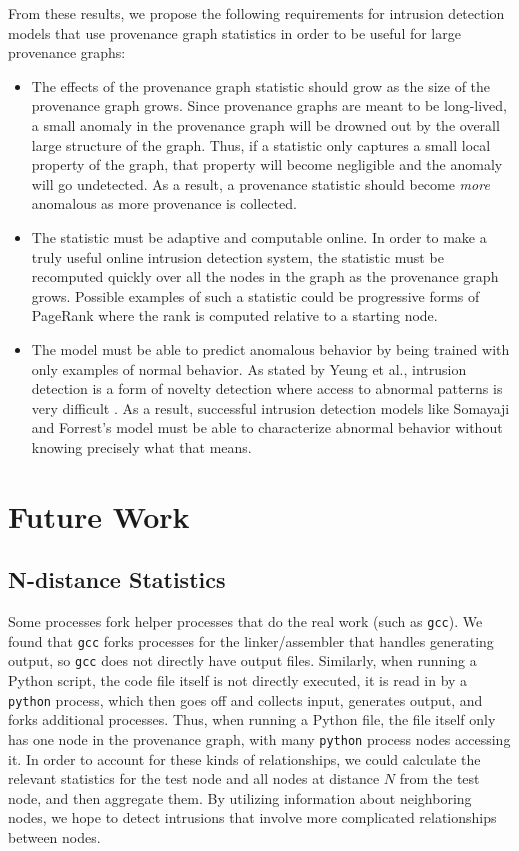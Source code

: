\documentclass[10pt,twocolumn]{article}
\begin{document}
From these results, we propose the following requirements for intrusion detection models that use provenance graph statistics in order to be useful for large provenance graphs:

\begin{itemize}
\item The effects of the provenance graph statistic should grow as the size of the provenance graph grows. Since provenance graphs are meant to be long-lived, a small anomaly in the provenance graph will be drowned out by the overall large structure of the graph. Thus, if a statistic only captures a small local property of the graph, that property will become negligible and the anomaly will go undetected. As a result, a provenance statistic should become {\em more} anomalous as more provenance is collected.

\item The statistic must be adaptive and computable online. In order to make a truly useful online intrusion detection system, the statistic must be recomputed quickly over all the nodes in the graph as the provenance graph grows. Possible examples of such a statistic could be progressive forms of PageRank where the rank is computed relative to a starting node.

\item The model must be able to predict anomalous behavior by being trained with only examples of normal behavior. As stated by Yeung et al., intrusion detection is a form of novelty detection where access to abnormal patterns is very difficult \cite{parzen}. As a result, successful intrusion detection models like Somayaji and Forrest's model must be able to characterize abnormal behavior without knowing precisely what that means.
\end{itemize}



%

\section{Future Work}

\subsection{N-distance Statistics}
Some processes fork helper processes that do the real work (such as \texttt{gcc}). We found that \texttt{gcc} forks processes for the linker/assembler that handles generating output, so \texttt{gcc} does not directly have output files. Similarly, when running a Python script, the code file itself is not directly executed, it is read in by a \texttt{python} process, which then goes off and collects input, generates output, and forks additional processes. Thus, when running a Python file, the file itself only has one node in the provenance graph, with many \texttt{python} process nodes accessing it. In order to account for these kinds of relationships, we could calculate the relevant statistics for the test node and all nodes at distance $N$ from the test node, and then aggregate them. By utilizing information about neighboring nodes, we hope to detect intrusions that involve more complicated relationships
between nodes.
\end{document}
